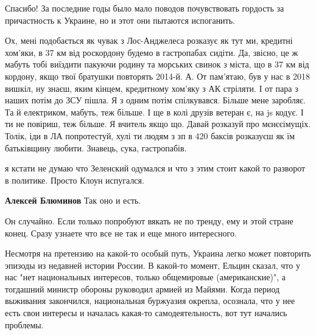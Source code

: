  
 
 
 
 
\zzSecCmt

\begin{itemize} %

Спасибо! За последние годы было мало поводов почувствовать гордость за
причастность к Украине, но и этот они пытаются испоганить.


Ох, мені подобається як чувак з Лос-Анджелеса розказує як тут ми, кредитні
хом'яки, в 37 км від роскордону будемо в гастропабах сидіти. Да, звісно, це ж
мабуть тобі виїздити пакуючи родину та морських свинок з міста, що в 37 км від
кордону, якщо твої братушки повторять 2014-й. А. От пам'ятаю, був у нас в 2018
вишкіл, ну знаєш, яким кінцем, кредитному хом'яку з АК стріляти. І от пара з
наших потім до ЗСУ пішла. Я з одним потім спілкувався. Більше мене заробляє. Та
й електриком, мабуть, теж більше. І ще в колі друзів ветеран є, на js кодує. І
ти не повіриш, теж більше. Я вчитель якщо що. Давай розказуй про мєнєєімущіх.
Толік, іди в ЛА попротестуй, хулі ти людям з зп в 420 баксів розказуєш як їм
батьківщину любити. Знавець, сука, гастропабів.


я кстати не думаю что Зеленский одумался и что з этим стоит какой то разворот в
политике. Просто Клоун испугался.

\textbf{Алексей Блюминов} Так оно и есть.


Он случайно. Если только попробуют вякать не по тренду, ему и этой стране
конец. Сразу узнаете что все не так и еще много интересного.

Несмотря на претензию на какой-то особый путь, Украина легко может повторить
эпизоды из недавней истории России. В какой-то момент, Ельцин сказал, что у нас
"нет национальных интересов, только общемировые (американские)", а тогдашний
министр обороны руководил армией из Майями. Когда период выживания закончился,
национальная буржуазия окрепла, осознала, что у нее есть свои интересы и
началась какая-то самодеятельность, вот тут начались проблемы.


\end{itemize}
